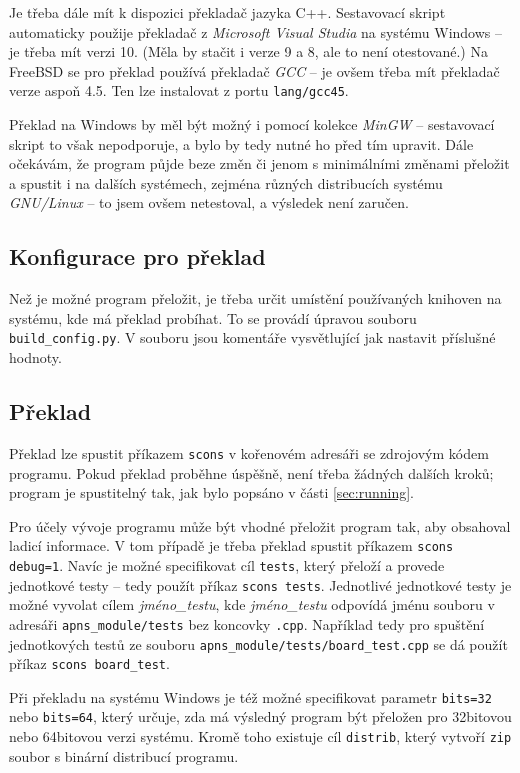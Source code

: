 \documentclass{article}
\begin{document}
Je třeba dále mít k dispozici překladač jazyka C++. Sestavovací skript automaticky použije překladač z \emph{Microsoft
Visual Studia} na systému Windows -- je třeba mít verzi 10. (Měla by stačit i verze 9 a 8, ale to není otestované.) Na
FreeBSD se pro překlad používá překladač \emph{GCC} -- je ovšem třeba mít překladač verze aspoň 4.5. Ten lze instalovat
z portu \texttt{lang/gcc45}.

Překlad na Windows by měl být možný i pomocí kolekce \emph{MinGW} -- sestavovací skript to však nepodporuje, a bylo by
tedy nutné ho před tím upravit. Dále očekávám, že program půjde beze změn či jenom s minimálními změnami přeložit a
spustit i na dalších systémech, zejména různých distribucích systému \emph{GNU/Linux} -- to jsem ovšem netestoval, a
výsledek není zaručen.

\subsection{Konfigurace pro překlad}
Než je možné program přeložit, je třeba určit umístění používaných knihoven na systému, kde má překlad probíhat. To se
provádí úpravou souboru \texttt{build\_config.py}. V souboru jsou komentáře vysvětlující jak nastavit příslušné hodnoty.

\subsection{Překlad}
Překlad lze spustit příkazem \verb+scons+ v kořenovém adresáři se zdrojovým kódem programu. Pokud překlad proběhne
úspěšně, není třeba žádných dalších kroků; program je spustitelný tak, jak bylo popsáno v části \ref{sec:running}.

Pro účely vývoje programu může být vhodné přeložit program tak, aby obsahoval ladicí informace. V tom případě je třeba
překlad spustit příkazem \verb+scons debug=1+. Navíc je možné specifikovat cíl \texttt{tests}, který přeloží a provede
jednotkové testy -- tedy použít příkaz \verb+scons tests+. Jednotlivé jednotkové testy je možné vyvolat cílem
\emph{jméno\_testu}, kde \emph{jméno\_testu} odpovídá jménu souboru v adresáři \texttt{apns\_module/tests} bez koncovky
\texttt{.cpp}. Například tedy pro spuštění jednotkových testů ze souboru \texttt{apns\_module/tests/board\_test.cpp} se
dá použít příkaz \verb+scons board_test+.

Při překladu na systému Windows je též možné specifikovat parametr \texttt{bits=32} nebo \texttt{bits=64}, který určuje,
zda má výsledný program být přeložen pro 32bitovou nebo 64bitovou verzi systému. Kromě toho existuje cíl
\texttt{distrib}, který vytvoří \texttt{zip} soubor s binární distribucí programu.
\end{document}
